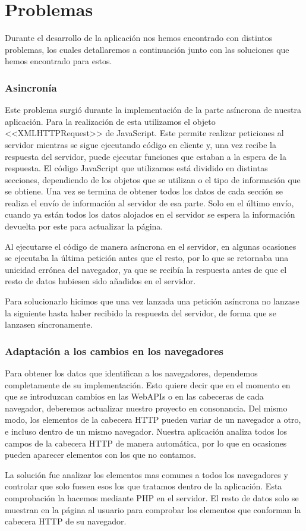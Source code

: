 \section{Problemas}
Durante el desarrollo de la aplicación nos hemos encontrado con distintos problemas, los cuales detallaremos a continuación junto con las soluciones que hemos encontrado para estos.
\subsubsection{Asincronía}
Este problema surgió durante la implementación de la parte asíncrona de nuestra aplicación. Para la realización de esta utilizamos el objeto  <<XMLHTTPRequest>> de JavaScript. Este permite realizar peticiones al servidor mientras se sigue ejecutando código en cliente y, una vez recibe la respuesta del servidor, puede ejecutar funciones que estaban a la espera de la respuesta. El código JavaScript que utilizamos está dividido en distintas secciones, dependiendo de los objetos que se utilizan o el tipo de información que se obtiene. Una vez se termina de obtener todos los datos de cada sección se realiza el envío de información al servidor de esa parte. Solo en el último envío, cuando ya están todos los datos alojados en el servidor se espera la información devuelta por este para actualizar la página.\par 
Al ejecutarse el código de manera asíncrona en el servidor, en algunas ocasiones se ejecutaba la última petición antes que el resto, por lo que se retornaba una unicidad errónea del navegador, ya que se recibía la respuesta antes de que el resto de datos hubiesen sido añadidos en el servidor.\par 
Para solucionarlo hicimos que una vez lanzada una petición asíncrona no lanzase la siguiente hasta haber recibido la respuesta del servidor, de forma que se lanzasen síncronamente.
\subsubsection{Adaptación a los cambios en los navegadores}
Para obtener los datos que identifican a los navegadores, dependemos completamente de su implementación. Esto quiere decir que en el momento en que se introduzcan cambios en las WebAPIs o en las cabeceras de cada navegador, deberemos actualizar nuestro proyecto en consonancia. Del mismo modo, los elementos de la cabecera HTTP pueden variar de un navegador a otro, e incluso dentro de un mismo navegador. Nuestra aplicación analiza todos los campos de la cabecera HTTP de manera automática, por lo que en ocasiones pueden aparecer elementos con los que no contamos.\par 
La solución fue analizar los elementos mas comunes a todos los navegadores y controlar que solo fuesen esos los que tratamos dentro de la aplicación. Esta comprobación la hacemos mediante PHP en el servidor. El resto de datos solo se muestran en la página al usuario para comprobar los elementos que conforman la cabecera HTTP de su navegador.
